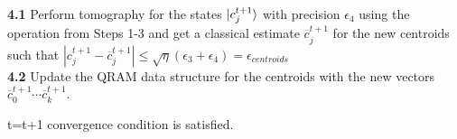 \documentclass{article}
\newcommand{\errnorms}{\epsilon_3}
\newcommand{\errtom}{\epsilon_4}
\newcommand{\norm}[1]{\left\lVert#1\right\rVert}
\begin{document}
\begin{algorithm}
\begin{algorithmic}[1]
	
	 \\
	{\bf 4.1} Perform tomography for the states $\ket{c_{j}^{t+1}}$ 
	with precision $\errtom$ using the operation from Steps 1-3  and get a classical estimate $\overline{c}_j^{t+1}$ for the new centroids such that $|c_j^{t+1} - \overline{c}_j^{t+1}| \leq \sqrt{\eta}(\errnorms+\errtom) = \epsilon_{centroids}$\\ %
	{\bf 4.2} Update the QRAM data structure for the centroids with the new vectors $\overline{c}^{t+1}_0 \cdots \overline{c}^{t+1}_k$. 
	
	\Statex t=t+1
	\Until convergence condition is satisfied. 
	
	\end{algorithmic}
	\end{algorithm}
\end{document}
